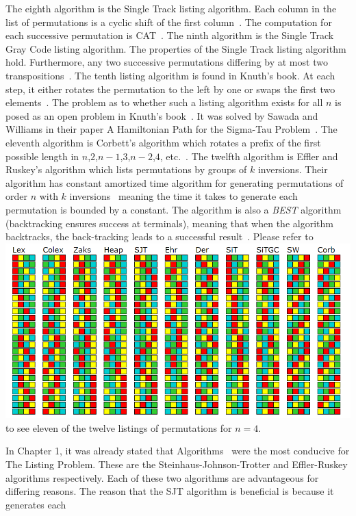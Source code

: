 The eighth algorithm is the Single Track listing algorithm. Each column in the list of permutations 
is a cyclic shift of the first column~\cite{A36}. The computation for each successive permutation 
is CAT~\cite{A36}.
The ninth algorithm is the Single Track Gray Code listing algorithm. The properties of the Single Track 
listing algorithm hold. Furthermore, any two successive permutations differing by at most two transpositions~\cite{A36}.
The tenth listing algorithm is found in Knuth's book. At each step, it either rotates the permutation to the left by one 
or swaps the first two elements~\cite{A37}. The problem as to whether such a listing algorithm exists for all $n$ 
is posed as an open problem in Knuth's book~\cite{A37}. It was solved by Sawada and Williams in their paper 
A Hamiltonian Path for the Sigma-Tau Problem~\cite{A38}.
The eleventh algorithm is Corbett's algorithm which rotates a prefix of the first possible length in 
$n$,$2$,$n-1$,$3$,$n-2$,$4$, etc.~\cite{A34}. 
The twelfth algorithm is Effler and Ruskey's algorithm which lists permutations by groups of $k$ inversions. Their algorithm has 
constant amortized time algorithm for generating permutations of order $n$ with $k$ inversions~\cite{A26} meaning 
the time it takes to generate each permutation is bounded by a constant.
The algorithm is also a \emph{BEST} algorithm (backtracking ensures success at terminals), meaning that when the algorithm backtracks, 
the back-tracking leads to a successful result~\cite{A26}. Please refer to \includegraphics{11perms} to see eleven of the twelve 
listings of permutations for $n=4$.\par 
In Chapter 1, it was already stated that Algorithms~\cite{A25}\cite{A26} were the most conducive for The Listing Problem. 
These are the Steinhaus-Johnson-Trotter and Effler-Ruskey algorithms respectively. Each of these two algorithms are 
advantageous for differing reasons. The reason that the SJT algorithm is beneficial is because it generates each 
